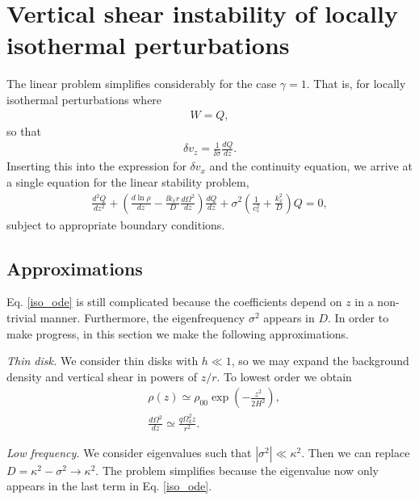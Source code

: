 \section{Vertical shear instability of locally
  isothermal perturbations}
The linear problem simplifies considerably for the case
$\gamma=1$. That is, for locally isothermal perturbations where
\begin{align}
  W=Q,
\end{align}
so that
\begin{align}
  \delta v_z = \frac{1}{\ii\sigma}\frac{dQ}{dz}. 
\end{align}
Inserting this into the expression for $\delta v_x$ and the continuity
equation, we arrive at a single equation for the linear stability
problem,
\begin{align}\label{iso_ode}
  \frac{d^2Q}{dz^2} + \left(\frac{d\ln{\rho}}{dz} - \frac{\ii k_x
      r}{D}\frac{d\Omega^2}{dz}\right) \frac{dQ}{dz} +
  \sigma^2\left(\frac{1}{c_s^2} + \frac{k_x^2}{D}\right)Q=0, 
\end{align} 
subject to appropriate boundary conditions. 

\subsection{Approximations}
Eq. \ref{iso_ode} is still complicated because the coefficients depend
on $z$ in a non-trivial manner. Furthermore, the eigenfrequency
$\sigma^2$ appears in $D$. In order to make progress, in this section
we make the following approximations. 

\emph{Thin disk.} We consider thin disks with $h\ll1$, so we may expand the
background density and vertical shear in powers of $z/r$. To lowest
order we obtain
\begin{align}
  &\rho(z) \simeq \rho_{00} \exp{\left(-\frac{z^2}{2H^2}\right)},\\
  &\frac{d\Omega^2}{dz} \simeq \frac{q\Omega_k^2z}{r^2}. 
\end{align}

\emph{Low frequency.} We consider eigenvalues such that
$|\sigma^2|\ll \kappa^2$. Then we can replace $D=\kappa^2 -\sigma^2\to
\kappa^2$. The problem simplifies because the eigenvalue now only
appears in the last term in Eq. \ref{iso_ode}. 


